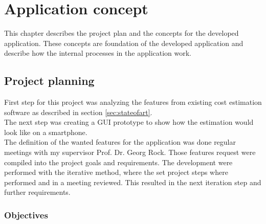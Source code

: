 \chapter{Application concept}

This chapter describes the project plan and the concepts for the developed application. These concepts are foundation of the developed application and describe how the internal processes in the application work.


\section{Project planning}

First step for this project was analyzing the features from existing cost estimation software as described in section \ref{sec:stateofart}. \\
The next step was creating a GUI prototype to show how the estimation would look like on a smartphone.\\
The definition of the wanted features for the application was done regular meetings with my supervisor Prof. Dr. Georg Rock. Those features request were compiled into the project goals and requirements. The development were performed with the iterative method, where the set project steps where performed and in a meeting reviewed. This resulted in the next iteration step and further requirements.

\subsection{Objectives}\label{objectives}

